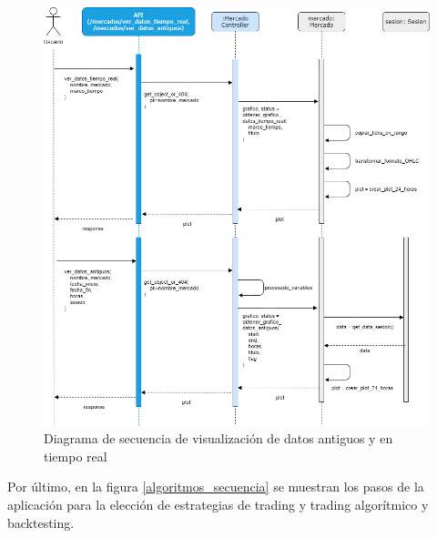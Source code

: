 \begin{figure}[h] 
	\includegraphics[width=1.1\textwidth]{imagenes/diagramas_secuencia/ver_datos.png}
	\caption{Diagrama de secuencia de visualización de datos antiguos y en tiempo real} \label{ver_datos_secuencia}
\end{figure}

Por último, en la figura \ref{algoritmos_secuencia} se muestran los pasos de la aplicación para la elección de estrategias de trading y trading algorítmico y backtesting.\newline

